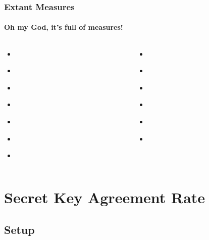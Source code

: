 \documentclass[final,serif,aspectratio=1610]{beamer}
\begin{document}
\begin{frame}
  \frametitle{Extant Measures}
  \framesubtitle{Oh my God, it's full of measures!}
  \begin{columns}
    \begin{column}{0.5\textwidth}
      \Large
      \begin{itemize}
        \item \Imin[]{}~\cite{williams2010nonnegative}
        \item \Iproj[]{}~\cite{harder2013bivariate}
        \item \Ibroja[]{}~\cite{bertschinger2014quantifying,banerjee2017computing}
        \item \Immi[]{}~\cite{bertschinger2013shared}
        \item \Iwedge[]{}~\cite{griffith2014intersection}
        \item \Irr[]{}~\cite{goodwell2017temporal}
        \item \Iccs[]{}~\cite{ince2017measuring}
      \end{itemize}
    \end{column}
    \begin{column}{0.5\textwidth}
      \Large
      \begin{itemize}
        \item \IRA[]{}~\cite{zwick2004overview}
        \item \Ipm[]{}~\cite{finn2018pointwise}
        \item \Idep[]{}~\cite{james2017unique,kay2018exact}
        \item \Irav[]{}~\cite{dit}
        \item \IUIi[]{}~\cite{banerjee2018unique}
        \item \IUIo[]{}~\cite{banerjee2018unique}
      \end{itemize}
    \end{column}
  \end{columns}
\end{frame}

\section{Secret Key Agreement Rate}

\subsection{Setup}
\end{document}

